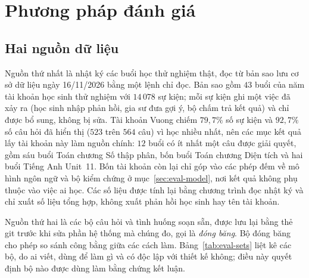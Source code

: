 \section{Phương pháp đánh giá}\label{sec:eval-method}

\subsection{Hai nguồn dữ liệu}
Nguồn thứ nhất là nhật ký các buổi học thử nghiệm thật, đọc từ bản sao lưu cơ sở dữ liệu ngày 16/11/2026 bằng một lệnh chỉ đọc. Bản sao gồm $43$ buổi của năm tài khoản học sinh thử nghiệm với $14\,078$ sự kiện; mỗi sự kiện ghi một việc đã xảy ra (học sinh nhập phản hồi, gia sư đưa gợi ý, bộ chấm trả kết quả) và chỉ được bổ sung, không bị sửa. Tài khoản Vuong chiếm $79{,}7\%$ số sự kiện và $92{,}7\%$ số câu hỏi đã hiển thị ($523$ trên $564$ câu) vì học nhiều nhất, nên các mục kết quả lấy tài khoản này làm nguồn chính: $12$ buổi có ít nhất một câu được giải quyết, gồm sáu buổi Toán chương Số thập phân, bốn buổi Toán chương Diện tích và hai buổi Tiếng Anh Unit~11. Bốn tài khoản còn lại chỉ góp vào các phép đếm về mô hình ngôn ngữ và bộ kiểm chứng ở mục~\ref{sec:eval-model}, nơi kết quả không phụ thuộc vào việc ai học. Các số liệu được tính lại bằng chương trình đọc nhật ký và chỉ xuất số liệu tổng hợp, không xuất phản hồi học sinh hay tên tài khoản.

Nguồn thứ hai là các bộ câu hỏi và tình huống soạn sẵn, được lưu lại bằng thẻ git trước khi sửa phần hệ thống mà chúng đo, gọi là \emph{đóng băng}. Bộ đóng băng cho phép so sánh công bằng giữa các cách làm. Bảng~\ref{tab:eval-sets} liệt kê các bộ, do ai viết, dùng để làm gì và có độc lập với thiết kế không; điều này quyết định bộ nào được dùng làm bằng chứng kết luận.

